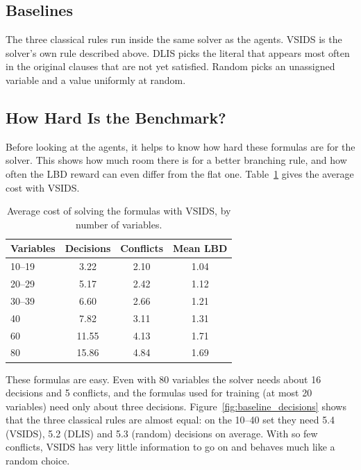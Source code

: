 \documentclass[11pt,a4paper]{article}
\begin{document}
\subsection{Baselines}

The three classical rules run inside the same solver as the agents. VSIDS is the solver's own rule described above. DLIS picks the literal that appears most often in the original clauses that are not yet satisfied. Random picks an unassigned variable and a value uniformly at random.

\subsection{How Hard Is the Benchmark?}

Before looking at the agents, it helps to know how hard these formulas are for the solver. This shows how much room there is for a better branching rule, and how often the LBD reward can even differ from the flat one. Table~\ref{tab:benchmark} gives the average cost with VSIDS.

\begin{table}[H]
    \centering
    \caption{Average cost of solving the formulas with VSIDS, by number of variables.}
    \label{tab:benchmark}
    \begin{tabular}{lccc}
        \toprule
        Variables & Decisions & Conflicts & Mean LBD \\
        \midrule
        10--19 & 3.22 & 2.10 & 1.04 \\
        20--29 & 5.17 & 2.42 & 1.12 \\
        30--39 & 6.60 & 2.66 & 1.21 \\
        40 & 7.82 & 3.11 & 1.31 \\
        60 & 11.55 & 4.13 & 1.71 \\
        80 & 15.86 & 4.84 & 1.69 \\
        \bottomrule
    \end{tabular}
\end{table}

These formulas are easy. Even with 80 variables the solver needs about 16 decisions and 5 conflicts, and the formulas used for training (at most 20 variables) need only about three decisions. Figure~\ref{fig:baseline_decisions} shows that the three classical rules are almost equal: on the 10--40 set they need 5.4 (VSIDS), 5.2 (DLIS) and 5.3 (random) decisions on average. With so few conflicts, VSIDS has very little information to go on and behaves much like a random choice.
\end{document}
